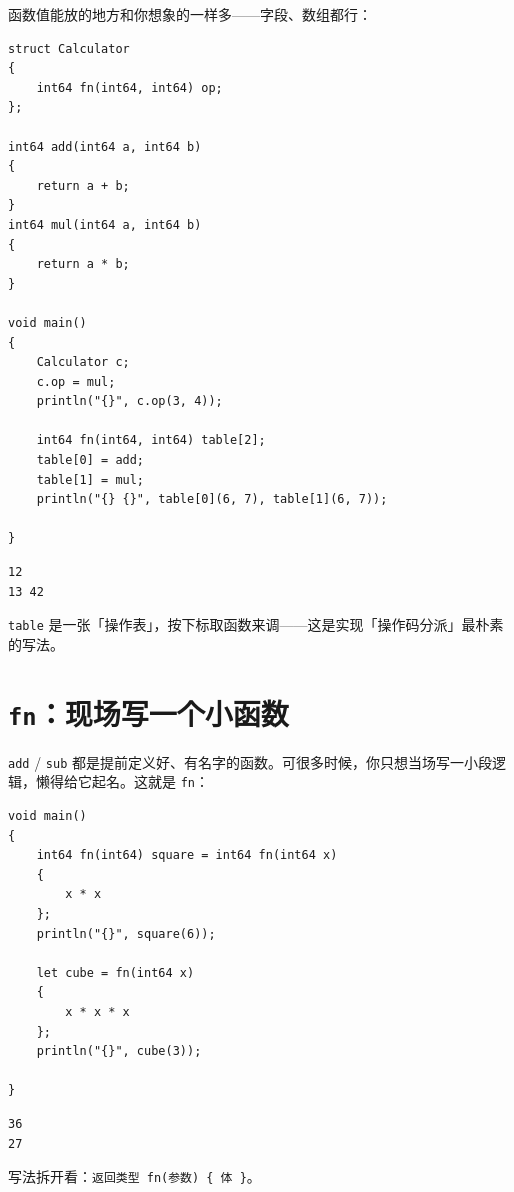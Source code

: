 函数值能放的地方和你想象的一样多——字段、数组都行：

\par
\medskip
\begin{lstlisting}[style=chali]
struct Calculator
{
    int64 fn(int64, int64) op;
};

int64 add(int64 a, int64 b)
{
    return a + b;
}
int64 mul(int64 a, int64 b)
{
    return a * b;
}

void main()
{
    Calculator c;
    c.op = mul;
    println("{}", c.op(3, 4));

    int64 fn(int64, int64) table[2];
    table[0] = add;
    table[1] = mul;
    println("{} {}", table[0](6, 7), table[1](6, 7));

}
\end{lstlisting}
\par
\medskip

\par
\medskip
\begin{lstlisting}[style=out]
12
13 42
\end{lstlisting}
\par
\medskip

\texttt{table} 是一张「操作表」，按下标取函数来调——这是实现「操作码分派」最朴素的写法。

\section{\texttt{fn}：现场写一个小函数}

\texttt{add} / \texttt{sub} 都是提前定义好、有名字的函数。可很多时候，你只想当场写一小段逻辑，懒得给它起名。这就是 \texttt{fn}：

\par
\medskip
\begin{lstlisting}[style=chali]
void main()
{
    int64 fn(int64) square = int64 fn(int64 x)
    {
        x * x
    };
    println("{}", square(6));

    let cube = fn(int64 x)
    {
        x * x * x
    };
    println("{}", cube(3));

}
\end{lstlisting}
\par
\medskip

\par
\medskip
\begin{lstlisting}[style=out]
36
27
\end{lstlisting}
\par
\medskip

写法拆开看：\texttt{返回类型 fn(\allowbreak{}参数)\allowbreak{} \{ 体 \}}。

